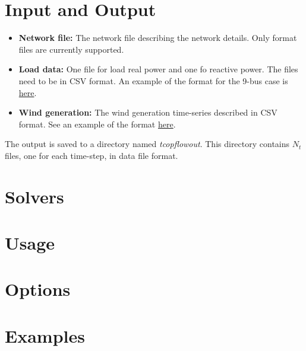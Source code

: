 \section{Input and Output}
\begin{itemize}
    \item \textbf{Network file:} The network file describing the network details. Only \matpower format files are currently supported.
    \item \textbf{Load data:} One file for load real power and one fo reactive power. The files need to be in CSV format. An example of the format for the 9-bus case is \href{https://gitlab.pnnl.gov/exasgd/frameworks/exago/-/tree/master/datafiles/case9}{here}.
    \item \textbf{Wind generation:} The wind generation time-series described in CSV format. See an example of the format \href{https://gitlab.pnnl.gov/exasgd/frameworks/exago/-/tree/master/datafiles/case9}{here}.
\end{itemize}


The \tcopflow output is saved to a directory named \emph{tcopflowout}. This directory contains $N_t$ files, one for each time-step, in \matpower data file format.

\section{Solvers}
\section{Usage}
\todo
\section{Options}
\todo
\section{Examples}
\todo
